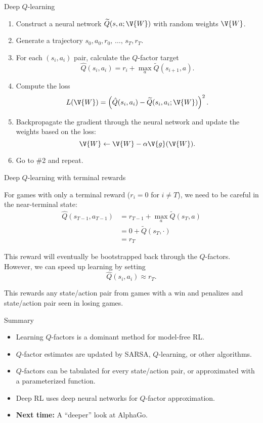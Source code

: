 \documentclass[9pt]{beamer}
\newcommand\VW{\V{W}}
\begin{document}
\begin{frame}{Deep $Q$-learning}

\begin{enumerate}
	\item Construct a neural network $\widetilde{Q}(s,a;\VW)$ with random weights $\VW$.
	\item<2-> Generate a trajectory $s_0,a_0,r_0,\,\ldots,\,s_T,r_T$.
	\item<3-> For each $(s_i,a_i)$ pair, calculate the $Q$-factor target
		\[ \hat{Q}(s_i,a_i) = r_i + \max_a \widetilde{Q}(s_{i+1},a). \]
	\item<4-> Compute the loss
		\[ L(\VW) = \left( \hat{Q}(s_i,a_i) - \widetilde{Q}(s_i,a_i;\VW) \right)^2. \]
	\item<5-> Backpropagate the gradient through the neural network and update the weights based on the loss:
		\[ \VW \leftarrow \VW - \alpha \V{g}(\VW). \]
	\item<6-> Go to \#2 and repeat.
\end{enumerate}
\end{frame}

\begin{frame}{Deep $Q$-learning with terminal rewards}

For games with only a terminal reward ($r_i = 0$ for $i\ne T$), we need to be careful in the near-terminal state:
\begin{align*} 
	\hat{Q}(s_{T-1},a_{T-1}) &= r_{T-1} + \max_a \widetilde{Q}(s_T,a) \\
	&= 0 + \widetilde{Q}(s_T,\cdot) \\
	&= r_T
\end{align*} 

\pause
\bigskip
This reward will eventually be bootstrapped back through the $Q$-factors. However, we can speed up learning by setting
\[ \hat{Q}(s_i,a_i) \approx r_T. \]

This rewards any state/action pair from games with a win and penalizes and state/action pair seen in losing games.
	
\end{frame}


\begin{frame}{Summary}

\begin{itemize}\addtolength{\itemsep}{0.5\baselineskip}
	\item Learning $Q$-factors is a dominant method for model-free RL.
	\item $Q$-factor estimates are updated by SARSA, $Q$-learning, or other algorithms.
	\item $Q$-factors can be tabulated for every state/action pair, or approximated with a parameterized function.
	\item Deep RL uses deep neural networks for $Q$-factor approximation.
	\item<2-> \textbf{Next time:} A ``deeper'' look at AlphaGo.
\end{itemize}
	
\end{frame}
\end{document}
